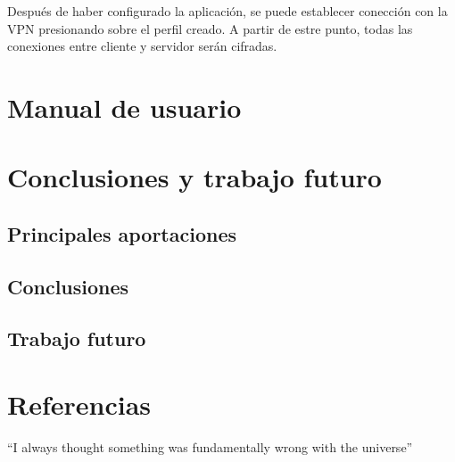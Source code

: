 \documentclass{article}
\begin{document}
            Después de haber configurado la aplicación, se puede establecer conección con la VPN presionando sobre el perfil creado. A partir de estre punto, todas las conexiones entre cliente y servidor serán cifradas.
            
    
\section{Manual de usuario}




\section{Conclusiones y trabajo futuro}


    \subsection{Principales aportaciones}




    \subsection{Conclusiones}



    \subsection{Trabajo futuro}


\section{Referencias}
``I always thought something was fundamentally wrong with the universe'' \citep{adams1995hitchhiker}



\end{document}
